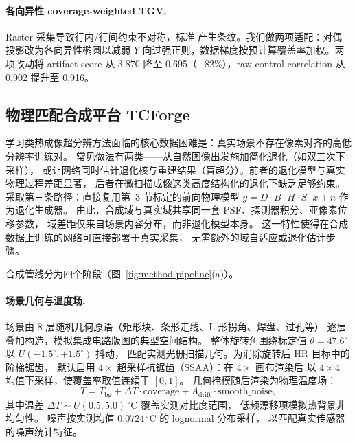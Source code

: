 \paragraph{各向异性 coverage-weighted TGV.}
Raster 采集导致行内/行间约束不对称，标准  产生条纹。我们做两项适配：对偶投影改为各向异性椭圆以减弱 \(Y\) 向过强正则，数据梯度按预计算覆盖率加权。两项改动将 artifact score 从 3.870 降至 0.695（\(-82\%\)），raw-control correlation 从 0.902 提升至 0.916。

\subsection{物理匹配合成平台 TCForge}
\label{sec:tcforge}

学习类热成像超分辨方法面临的核心数据困难是：真实场景不存在像素对齐的高低分辨率训练对。
常见做法有两类——从自然图像出发施加简化退化（如双三次下采样），
或让网络同时估计退化核与重建结果（盲超分）。前者的退化模型与真实物理过程差距显著，
后者在微扫描成像这类高度结构化的退化下缺乏足够约束。
 采取第三条路径：直接复用第~3 节标定的前向物理模型
\(y = D \cdot B \cdot H \cdot S \cdot x + n\) 作为退化生成器。
由此，合成域与真实域共享同一套 PSF、探测器积分、亚像素位移参数，
域差距仅来自场景内容分布，而非退化模型本身。
这一特性使得在合成数据上训练的网络可直接部署于真实采集，
无需额外的域自适应或退化估计步骤。

合成管线分为四个阶段（图~\ref{fig:method-pipeline}(a)）。

\paragraph{场景几何与温度场.}
场景由 8 层随机几何原语（矩形块、条形走线、L 形拐角、焊盘、过孔等）
逐层叠加构造，模拟集成电路版图的典型空间结构。
整体旋转角围绕标定值 \(\theta = 47.6^\circ\) 以 \(U(-1.5^\circ, +1.5^\circ)\) 抖动，
匹配实测光栅扫描几何。为消除旋转后 HR 目标中的阶梯锯齿，
默认启用 \(4\times\) 超采样抗锯齿（SSAA）：在 \(4\times\) 画布渲染后
以 \(4\times4\) 均值下采样，使覆盖率取值连续于 \([0,1]\)。
几何掩模随后渲染为物理温度场：
\begin{equation}
  T = T_{\mathrm{bg}} + \Delta T \cdot \mathrm{coverage}
      + A_{\mathrm{drift}} \cdot \mathrm{smooth\_noise},
\end{equation}
其中温差 \(\Delta T \sim U(0.5, 5.0)\,^\circ\)C 覆盖实测对比度范围，
低频漂移项模拟热背景非均匀性。
噪声按实测均值 \(0.0724\,^\circ\)C 的 lognormal 分布采样，
以匹配真实传感器的噪声统计特征。

